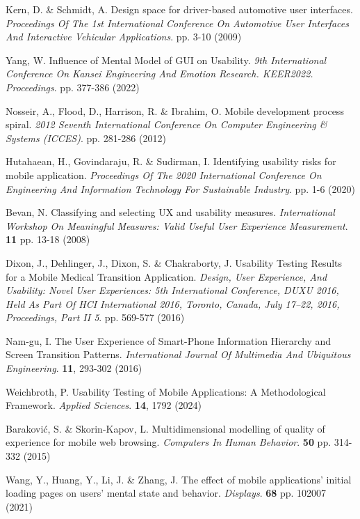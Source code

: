 \documentclass[preprint,12pt]{elsarticle}
\begin{document}
\begin{thebibliography}{99}
Kern, D. \& Schmidt, A. Design space for driver-based automotive user interfaces. {\em Proceedings Of The 1st International Conference On Automotive User Interfaces And Interactive Vehicular Applications}. pp. 3-10 (2009)

Yang, W. Influence of Mental Model of GUI on Usability. {\em 9th International Conference On Kansei Engineering And Emotion Research. KEER2022. Proceedings}. pp. 377-386 (2022)

Nosseir, A., Flood, D., Harrison, R. \& Ibrahim, O. Mobile development process spiral. {\em 2012 Seventh International Conference On Computer Engineering \& Systems (ICCES)}. pp. 281-286 (2012)

Hutahaean, H., Govindaraju, R. \& Sudirman, I. Identifying usability risks for mobile application. {\em Proceedings Of The 2020 International Conference On Engineering And Information Technology For Sustainable Industry}. pp. 1-6 (2020)

Bevan, N. Classifying and selecting UX and usability measures. {\em International Workshop On Meaningful Measures: Valid Useful User Experience Measurement}. \textbf{11} pp. 13-18 (2008)

Dixon, J., Dehlinger, J., Dixon, S. \& Chakraborty, J. Usability Testing Results for a Mobile Medical Transition Application. {\em Design, User Experience, And Usability: Novel User Experiences: 5th International Conference, DUXU 2016, Held As Part Of HCI International 2016, Toronto, Canada, July 17–22, 2016, Proceedings, Part II 5}. pp. 569-577 (2016)

Nam-gu, I. The User Experience of Smart-Phone Information Hierarchy and Screen Transition Patterns. {\em International Journal Of Multimedia And Ubiquitous Engineering}. \textbf{11}, 293-302 (2016)

Weichbroth, P. Usability Testing of Mobile Applications: A Methodological Framework. {\em Applied Sciences}. \textbf{14}, 1792 (2024)

Baraković, S. \& Skorin-Kapov, L. Multidimensional modelling of quality of experience for mobile web browsing. {\em Computers In Human Behavior}. \textbf{50} pp. 314-332 (2015)

Wang, Y., Huang, Y., Li, J. \& Zhang, J. The effect of mobile applications’ initial loading pages on users’ mental state and behavior. {\em Displays}. \textbf{68} pp. 102007 (2021)


\end{thebibliography}
\end{document}
